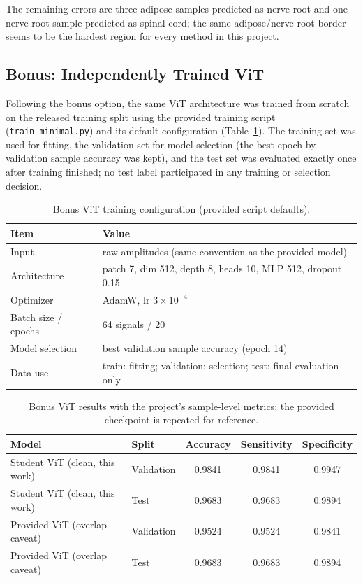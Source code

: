 \documentclass[11pt]{article}
\begin{document}
The remaining errors are three adipose samples predicted as nerve root and one
nerve-root sample predicted as spinal cord; the same adipose/nerve-root
border seems to be the hardest region for every method in this project.

\subsection{Bonus: Independently Trained ViT}
\label{sec:bonus}

Following the bonus option, the same ViT architecture was trained from scratch
on the released training split using the provided training script
(\texttt{train\_minimal.py}) and its default configuration
(Table~\ref{tab:bonuscfg}). The training set was used for fitting, the
validation set for model selection (the best epoch by validation sample
accuracy was kept), and the test set was evaluated exactly once after training
finished; no test label participated in any training or selection decision.

\begin{table}[htbp]
\centering
\caption{Bonus ViT training configuration (provided script defaults).}
\label{tab:bonuscfg}
\small
\begin{tabular}{ll}
\toprule
Item & Value\\
\midrule
Input & raw amplitudes (same convention as the provided model)\\
Architecture & patch 7, dim 512, depth 8, heads 10, MLP 512, dropout 0.15\\
Optimizer & AdamW, lr $3\times10^{-4}$\\
Batch size / epochs & 64 signals / 20\\
Model selection & best validation sample accuracy (epoch 14)\\
Data use & train: fitting; validation: selection; test: final evaluation only\\
\bottomrule
\end{tabular}
\end{table}

\begin{table}[htbp]
\centering
\caption{Bonus ViT results with the project's sample-level metrics; the
provided checkpoint is repeated for reference.}
\label{tab:bonusres}
\small
\begin{tabular}{llccc}
\toprule
Model & Split & Accuracy & Sensitivity & Specificity\\
\midrule
Student ViT (clean, this work) & Validation & 0.9841 & 0.9841 & 0.9947\\
Student ViT (clean, this work) & Test & 0.9683 & 0.9683 & 0.9894\\
Provided ViT (overlap caveat) & Validation & 0.9524 & 0.9524 & 0.9841\\
Provided ViT (overlap caveat) & Test & 0.9683 & 0.9683 & 0.9894\\
\bottomrule
\end{tabular}
\end{table}
\end{document}
